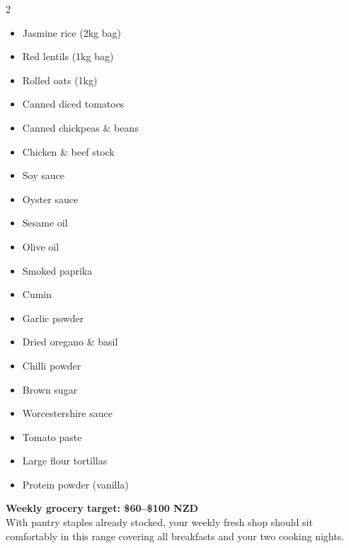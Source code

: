 \documentclass[12pt, a4paper]{book}
\begin{document}
\begin{multicols}{2}
\begin{itemize}[leftmargin=1.5em, itemsep=4pt]
  \item Jasmine rice (2kg bag)
  \item Red lentils (1kg bag)
  \item Rolled oats (1kg)
  \item Canned diced tomatoes
  \item Canned chickpeas \& beans
  \item Chicken \& beef stock
  \item Soy sauce
  \item Oyster sauce
  \item Sesame oil
  \item Olive oil
  \item Smoked paprika
  \item Cumin
  \item Garlic powder
  \item Dried oregano \& basil
  \item Chilli powder
  \item Brown sugar
  \item Worcestershire sauce
  \item Tomato paste
  \item Large flour tortillas
  \item Protein powder (vanilla)
\end{itemize}
\end{multicols}

\vspace{1cm}
\begin{macrobox}
  \textbf{Weekly grocery target: \$60--\$100 NZD}\\[4pt]
  With pantry staples already stocked, your weekly fresh shop should sit comfortably in this range covering all breakfasts and your two cooking nights.
\end{macrobox}
\end{document}
